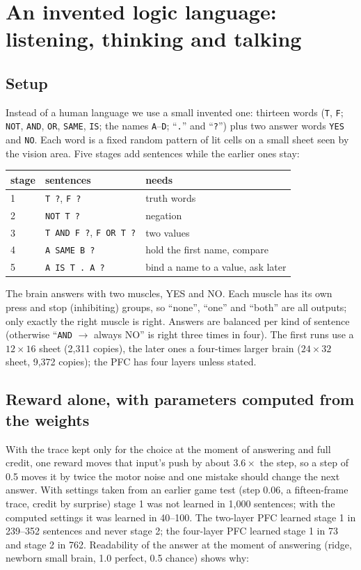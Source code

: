 \documentclass[11pt]{article}
\begin{document}
\section{An invented logic language: listening, thinking and talking}\label{sec:logic}

\subsection{Setup}
Instead of a human language we use a small invented one: thirteen words (\texttt{T}, \texttt{F}; \texttt{NOT},
\texttt{AND}, \texttt{OR}, \texttt{SAME}, \texttt{IS}; the names \texttt{A}--\texttt{D}; ``\texttt{.}'' and ``\texttt{?}'')
plus two answer words \texttt{YES} and \texttt{NO}. Each word is a fixed random pattern of lit cells on a small sheet seen
by the vision area. Five stages add sentences while the earlier ones stay:

\begin{center}\small
\begin{tabular}{lll}
\toprule
stage & sentences & needs\\
\midrule
1 & \texttt{T ?}, \texttt{F ?} & truth words\\
2 & \texttt{NOT T ?} & negation\\
3 & \texttt{T AND F ?}, \texttt{F OR T ?} & two values\\
4 & \texttt{A SAME B ?} & hold the first name, compare\\
5 & \texttt{A IS T . A ?} & bind a name to a value, ask later\\
\bottomrule
\end{tabular}
\end{center}

The brain answers with two muscles, YES and NO. Each muscle has its own press and stop (inhibiting) groups, so ``none'',
``one'' and ``both'' are all outputs; only exactly the right muscle is right. Answers are balanced per kind of sentence
(otherwise ``\texttt{AND} $\to$ always NO'' is right three times in four). The first runs use a $12\times16$ sheet (2,311 copies),
the later ones a four-times larger brain ($24\times32$ sheet, 9,372 copies); the PFC has four layers unless stated.

\subsection{Reward alone, with parameters computed from the weights}
With the trace kept only for the choice at the moment of answering and full credit, one reward moves that input's push by
about $3.6\times$ the step, so a step of 0.5 moves it by twice the motor noise and one mistake should change the next answer.
With settings taken from an earlier game test (step 0.06, a fifteen-frame trace, credit by surprise) stage 1 was not learned in
1,000 sentences; with the computed settings it was learned in 40--100. The two-layer PFC learned stage 1 in 239--352
sentences and never stage 2; the four-layer PFC learned stage 1 in 73 and stage 2 in 762. Readability of the answer at the
moment of answering (ridge, newborn small brain, 1.0 perfect, 0.5 chance) shows why:
\end{document}
